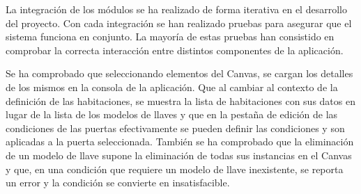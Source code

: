 La integración de los módulos se ha realizado de forma iterativa en el desarrollo del proyecto. Con cada integración se han realizado pruebas para asegurar que el sistema funciona en conjunto. La mayoría de estas pruebas han consistido en comprobar la correcta interacción entre distintos componentes de la aplicación.

Se ha comprobado que seleccionando elementos del Canvas, se cargan los detalles de los mismos en la consola de la aplicación. Que al cambiar al contexto de la definición de las habitaciones, se muestra la lista de habitaciones con sus datos en lugar de la lista de los modelos de llaves y que en la pestaña de edición de las condiciones de las puertas efectivamente se pueden definir las condiciones y son aplicadas a la puerta seleccionada.
También se ha comprobado que la eliminación de un modelo de llave supone la eliminación de todas sus instancias en el Canvas y que, en una condición que requiere un modelo de llave inexistente, se reporta un error y la condición se convierte en insatisfacible.